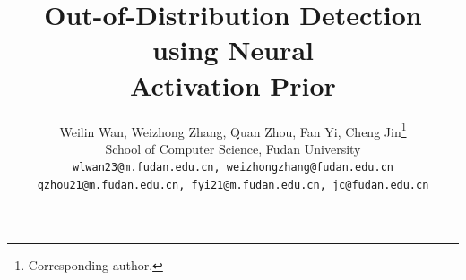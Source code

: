 \documentclass{article}
\title{Out-of-Distribution Detection using Neural \\ Activation Prior}
\author{%
  Weilin Wan, Weizhong Zhang, Quan Zhou, Fan Yi, Cheng Jin\thanks{Corresponding author.}\\ 
  School of Computer Science, Fudan University \\
  \texttt{wlwan23@m.fudan.edu.cn, weizhongzhang@fudan.edu.cn}\\
  \texttt{qzhou21@m.fudan.edu.cn, fyi21@m.fudan.edu.cn, jc@fudan.edu.cn}\\
}
\begin{document}
\maketitle








% 
% 
{
	\small
	
	
}



\end{document}
